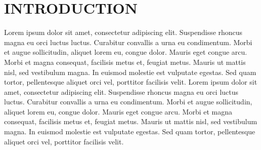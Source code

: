 \section{\uppercase{Introduction}}
Lorem ipsum dolor sit amet, consectetur adipiscing elit. Suspendisse rhoncus magna eu orci luctus luctus. Curabitur convallis a urna eu condimentum. Morbi et augue sollicitudin, aliquet lorem eu, congue dolor. Mauris eget congue arcu. Morbi et magna consequat, facilisis metus et, feugiat metus. Mauris ut mattis nisl, sed vestibulum magna. In euismod molestie est vulputate egestas. Sed quam tortor, pellentesque aliquet orci vel, porttitor facilisis velit. Lorem ipsum dolor sit amet, consectetur adipiscing elit. Suspendisse rhoncus magna eu orci luctus luctus. Curabitur convallis a urna eu condimentum. Morbi et augue sollicitudin, aliquet lorem eu, congue dolor. Mauris eget congue arcu. Morbi et magna consequat, facilisis metus et, feugiat metus. Mauris ut mattis nisl, sed vestibulum magna. In euismod molestie est vulputate egestas. Sed quam tortor, pellentesque aliquet orci vel, porttitor facilisis velit.
